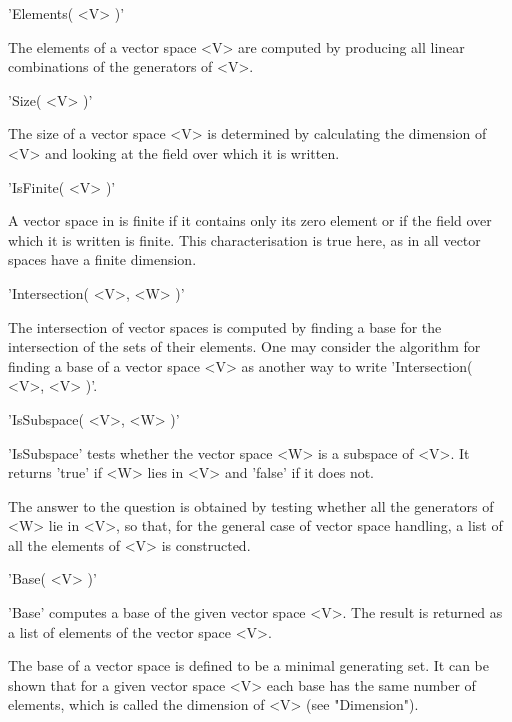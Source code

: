 \vspace{5mm}
'Elements( <V> )'

The elements of  a vector space <V> are computed  by producing all linear
combinations of the generators of <V>.

\vspace{5mm}
'Size( <V> )'

The size of a vector space <V> is determined by calculating the dimension
of <V> and looking at the field over which it is written.

\vspace{5mm}
'IsFinite( <V> )'

A vector space in  {\GAP} is finite if it contains  only its zero element
or if the field over which it is written is finite. This characterisation
is true here, as in {\GAP} all vector spaces have a finite dimension.

\vspace{5mm}
'Intersection( <V>, <W> )'

The intersection of  vector  spaces is computed by finding a base for the
intersection  of  the  sets  of  their  elements.  One  may consider  the
algorithm  for finding a base of  a vector  space <V> as  another  way to
write 'Intersection( <V>, <V> )'.



'IsSubspace( <V>, <W> )'

'IsSubspace' tests whether the  vector space <W> is a subspace of <V>. It
returns 'true' if <W> lies in <V> and 'false' if it does not.

The  answer to  the question  is  obtained by  testing  whether  all  the
generators of <W> lie in <V>, so  that, for  the general  case of  vector
space handling, a list of all the elements of <V> is constructed.


%

'Base( <V> )'

'Base' computes  a  base  of the  given vector space <V>.  The  result is
returned as a list of elements of the vector space <V>.

The base of a vector space is defined to be a minimal generating set.  It
can be  shown  that for a given vector space  <V> each base has  the same
number   of  elements,  which  is  called   the  dimension  of  <V>  (see
"Dimension").

